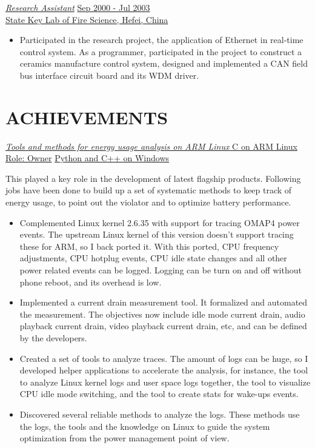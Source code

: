 \documentclass{res}
\begin{document}
\begin{resume}
        \uline{{\sl Research Assistant}} \hfill                 \uline{Sep 2000 - Jul 2003}\\
        \uline{State Key Lab of Fire Science, Hefei, China}
        \begin{itemize}
        \item Participated in the research project, the application of Ethernet in real-time
        control system. As a programmer, participated in the project to construct a ceramics
        manufacture control system, designed and implemented a CAN field bus interface
        circuit board and its WDM driver.
	\end{itemize}

\section{ACHIEVEMENTS}

\uline{{\sl Tools and methods for energy usage analysis on ARM Linux }} \hfill \uline{C on ARM Linux}\\
\uline{Role: Owner} \hfill \uline{Python and C++ on Windows}

This played a key role in the development of latest flagship products. Following jobs have been done to build up a set of systematic methods to keep track of energy usage, to point out the violator and to optimize battery performance.

\begin{itemize}
\item Complemented Linux kernel 2.6.35 with support for tracing OMAP4 power events. The upstream Linux kernel of this version doesn't support tracing these for ARM, so I back ported it. With this ported, CPU frequency adjustments, CPU hotplug events, CPU idle state changes and all other power related events can be logged. Logging can be turn on and off without phone reboot, and its overhead is low.
\item Implemented a current drain measurement tool. It formalized and automated the measurement. The objectives now include idle mode current drain, audio playback current drain, video playback current drain, etc, and can be defined by the developers. 
\item Created a set of tools to analyze traces. The amount of logs can be huge, so I developed helper applications to accelerate the analysis, for instance, the tool to analyze Linux kernel logs and user space logs together, the tool to visualize CPU idle mode switching, and the tool to create stats for wake-ups events. 
\item Discovered several reliable methods to analyze the logs. These methods use the logs, the tools and the knowledge on Linux to guide the system optimization from the power management point of view.
\end{itemize}


\end{resume}
\end{document}
